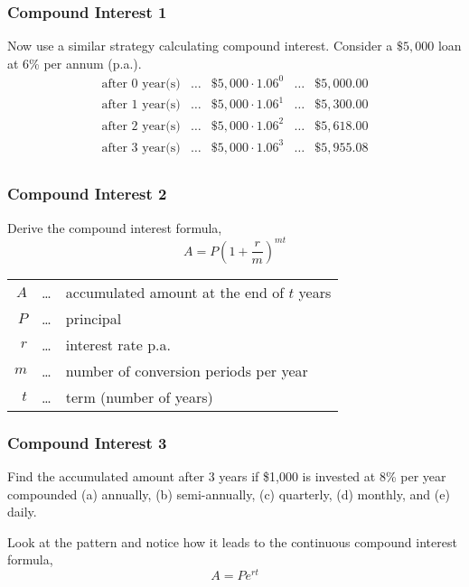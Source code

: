 \documentclass[xcolor=dvipsnames]{beamer}
\begin{document}
\begin{frame}
  \frametitle{Compound Interest 1}
Now use a similar strategy calculating compound interest. Consider a
$\$5,000$ loan at 6\% per annum (p.a.). 
\begin{equation}
  \label{eq:booyiezi}
  \begin{array}{rcccl}
        \mbox{after }0\mbox{ year(s)} & \ldots & \$5,000\cdot{}1.06^{0} & \ldots & \$5,000.00 \\
        \mbox{after }1\mbox{ year(s)} & \ldots & \$5,000\cdot{}1.06^{1} & \ldots & \$5,300.00 \\
        \mbox{after }2\mbox{ year(s)} & \ldots & \$5,000\cdot{}1.06^{2} & \ldots & \$5,618.00 \\
        \mbox{after }3\mbox{ year(s)} & \ldots & \$5,000\cdot{}1.06^{3} & \ldots & \$5,955.08 \\
  \end{array}
\end{equation}
\end{frame}

\begin{frame}
  \frametitle{Compound Interest 2}
Derive the \alert{compound interest formula},
\begin{equation}
  \label{eq:paeniawa}
  A=P\left(1+\frac{r}{m}\right)^{mt}
\end{equation}
\begin{tabular}{rcl}
  $A$&\ldots&accumulated amount at the end of $t$ years \\
  $P$&\ldots&principal \\
  $r$&\ldots&interest rate p.a. \\
  $m$&\ldots&number of conversion periods per year \\
  $t$&\ldots&term (number of years)
\end{tabular}
\end{frame}

\begin{frame}
  \frametitle{Compound Interest 3}
{\ubung} Find the accumulated amount after 3 years if \$1,000 is invested at
8\% per year compounded (a) annually, (b) semi-annually, (c)
quarterly, (d) monthly, and (e) daily. 

\medskip

Look at the pattern and notice how it leads to the \alert{continuous
  compound interest formula},
\begin{equation}
  \label{eq:johsheth}
  A=Pe^{rt}
\end{equation}
\end{frame}
\end{document}
